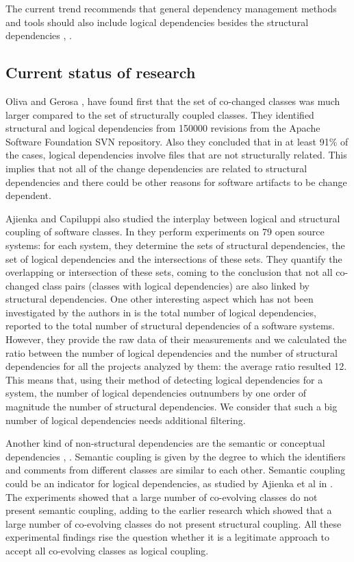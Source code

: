 \documentclass[12pt]{mitthesis}
\begin{document}
The current trend recommends that general dependency management methods and tools should also include logical dependencies besides the structural dependencies \cite{Oliva:2011:ISL:2067853.2068086}, \cite{DBLP:journals/jss/AjienkaC17}. 



\subsection{Current status of research}

Oliva and Gerosa \cite{Oliva:2011:ISL:2067853.2068086}, \cite{DBLP:conf/issre/OlivaG15} have found first that the set of co-changed classes was much larger compared to the set of structurally coupled classes. They identified structural and logical dependencies from 150000 revisions from the Apache Software Foundation SVN repository. Also they concluded  that in at least 91\% of the cases, logical dependencies involve files that are not structurally related. This implies that not all of the change dependencies are related to structural dependencies and there could be other reasons for software artifacts to be change dependent.

Ajienka and Capiluppi also studied the interplay between logical and structural coupling of software classes. In \cite{DBLP:journals/jss/AjienkaC17} they  perform experiments on 79 open source systems: for each system, they determine the sets of structural dependencies, the set of logical dependencies and the intersections of these sets. They quantify the overlapping or intersection of these sets, coming to the conclusion that not all co-changed class pairs (classes with logical dependencies) are also linked by structural dependencies. One other interesting aspect which has not been investigated by the authors in \cite{DBLP:journals/jss/AjienkaC17}  is the total number of logical dependencies, reported to the total number of structural dependencies of a software systems. However, they provide the raw data of their measurements and we calculated the ratio between the number of logical dependencies and the number of structural dependencies for all the projects analyzed by them: the average ratio resulted 12.  This means that, using their method of detecting logical dependencies for a system, the number of logical dependencies outnumbers by one order of magnitude the number of structural dependencies. We consider that such a big number of logical dependencies needs additional filtering. 


Another kind of non-structural dependencies are the semantic or conceptual dependencies \cite{Poshyvanyk2009}, \cite{posh2010}. Semantic coupling is given by the degree to which the identifiers and comments from different classes are similar to each other. Semantic coupling could be an indicator for logical dependencies, as studied by Ajienka et al in \cite{DBLP:journals/ese/AjienkaCC18}. The experiments showed that a large number of co-evolving classes do not present semantic coupling, adding to the earlier research which showed that a large number of co-evolving classes do not present structural coupling. All these experimental findings rise the question whether it is a legitimate approach to accept all co-evolving classes as logical coupling.
\end{document}
